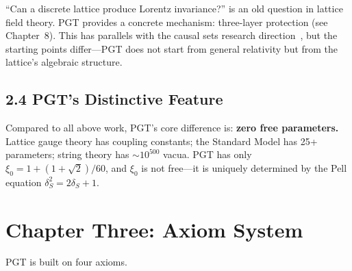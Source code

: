 \documentclass[11pt,a4paper]{article}
\begin{document}
``Can a discrete lattice produce Lorentz invariance?'' is an old question in lattice field theory. PGT provides a concrete mechanism: three-layer protection (see Chapter~8). This has parallels with the causal sets research direction~\cite{bombelli}, but the starting points differ---PGT does not start from general relativity but from the lattice's algebraic structure.

\subsection{2.4 PGT's Distinctive Feature}

Compared to all above work, PGT's core difference is: \textbf{zero free parameters.} Lattice gauge theory has coupling constants; the Standard Model has 25+ parameters; string theory has $\sim10^{500}$ vacua. PGT has only $\xi_0 = 1 + (1+\sqrt{2})/60$, and $\xi_0$ is not free---it is uniquely determined by the Pell equation $\delta_S^2 = 2\delta_S + 1$.

\section{Chapter Three: Axiom System}\label{sec:ch3}

PGT is built on four axioms.
\end{document}
